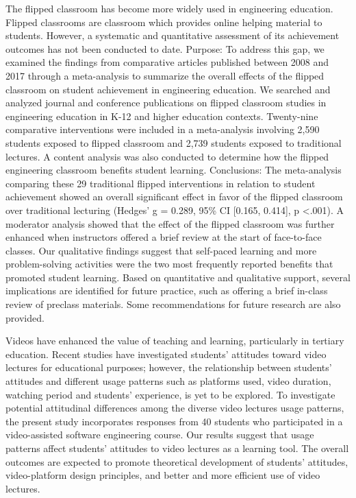 The flipped classroom has become more widely used in engineering education. Flipped classrooms are classroom which provides online helping material to students. However, a systematic and quantitative assessment of its achievement outcomes has not been conducted to date. Purpose: To address this gap, we examined the findings from comparative articles published between 2008 and 2017 through a meta-analysis to summarize the overall effects of the flipped classroom on student achievement in engineering education. We searched and analyzed journal and conference publications on flipped classroom studies in engineering education in K-12 and higher education contexts. Twenty-nine comparative interventions were included in a meta-analysis involving 2,590 students exposed to flipped classroom and 2,739 students exposed to traditional lectures. A content analysis was also conducted to determine how the flipped engineering classroom benefits student learning. Conclusions: The meta-analysis comparing these 29 traditional flipped interventions in relation to student achievement showed an overall significant effect in favor of the flipped classroom over traditional lecturing (Hedges' g = 0.289, 95\% CI [0.165, 0.414], p <.001). A moderator analysis showed that the effect of the flipped classroom was further enhanced when instructors offered a brief review at the start of face-to-face classes. Our qualitative findings suggest that self-paced learning and more problem-solving activities were the two most frequently reported benefits that promoted student learning. Based on quantitative and qualitative support, several implications are identified for future practice, such as offering a brief in-class review of preclass materials. Some recommendations for future research are also provided.\cite{Lo2019}


Videos have enhanced the value of teaching and learning, particularly in tertiary education. Recent studies have investigated students' attitudes toward video lectures for educational purposes; however, the relationship between students' attitudes and different usage patterns such as platforms used, video duration, watching period and students' experience, is yet to be explored. To investigate potential attitudinal differences among the diverse video lectures usage patterns, the present study incorporates responses from 40 students who participated in a video-assisted software engineering course. Our results suggest that usage patterns affect students' attitudes to video lectures as a learning tool. The overall outcomes are expected to promote theoretical development of students' attitudes, video-platform design principles, and better and more efficient use of video lectures.\cite{Giannakos2016}



